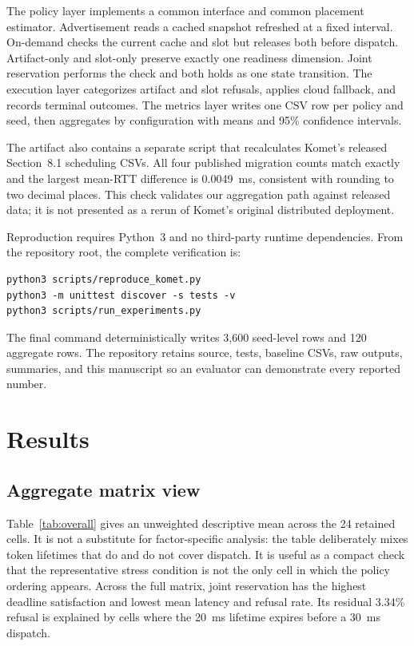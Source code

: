 \documentclass[conference]{IEEEtran}
\begin{document}
The policy layer implements a common interface and common placement estimator.
Advertisement reads a cached snapshot refreshed at a fixed interval. On-demand
checks the current cache and slot but releases both before dispatch. Artifact-only
and slot-only preserve exactly one readiness dimension. Joint reservation performs
the check and both holds as one state transition. The execution layer categorizes
artifact and slot refusals, applies cloud fallback, and records terminal outcomes.
The metrics layer writes one CSV row per policy and seed, then aggregates by
configuration with means and 95\% confidence intervals.

The artifact also contains a separate script that recalculates Komet's released
Section~8.1 scheduling CSVs. All four published migration counts match exactly and
the largest mean-RTT difference is 0.0049~ms, consistent with rounding to two
decimal places. This check validates our aggregation path against released data;
it is not presented as a rerun of Komet's original distributed deployment.

Reproduction requires Python~3 and no third-party runtime dependencies. From the
repository root, the complete verification is:
\begin{verbatim}
python3 scripts/reproduce_komet.py
python3 -m unittest discover -s tests -v
python3 scripts/run_experiments.py
\end{verbatim}
The final command deterministically writes 3,600 seed-level rows and 120 aggregate
rows. The repository retains source, tests, baseline CSVs, raw outputs, summaries,
and this manuscript so an evaluator can demonstrate every reported number.

\section{Results}

\subsection{Aggregate matrix view}

Table~\ref{tab:overall} gives an unweighted descriptive mean across the 24 retained
cells. It is not a substitute for factor-specific analysis: the table deliberately
mixes token lifetimes that do and do not cover dispatch. It is useful as a compact
check that the representative stress condition is not the only cell in which the
policy ordering appears. Across the full matrix, joint reservation has the highest
deadline satisfaction and lowest mean latency and refusal rate. Its residual
3.34\% refusal is explained by cells where the 20~ms lifetime expires before a
30~ms dispatch.
\end{document}
